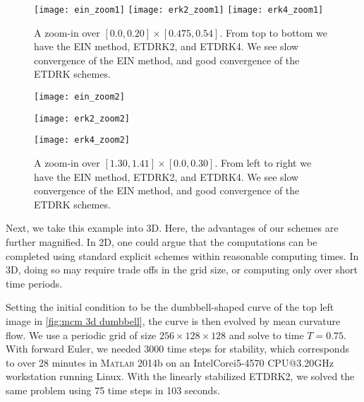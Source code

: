 \begin{figure}[htb!]
        \centering
\texttt{[image: ein\_zoom1]}
\texttt{[image: erk2\_zoom1]}
\texttt{[image: erk4\_zoom1]}
\caption[{A zoom-in over $ [0.0,0.20]\times [0.475,0.54]$ to inspect convergence.}]{A zoom-in over $[0.0, 0.20]\times [0.475, 0.54]$. From top to bottom we have the EIN method, ETDRK2, and ETDRK4. We see slow convergence of the EIN method, and good convergence of the ETDRK schemes.}
\label{fig:mcm zoom in 1}
\end{figure}

\begin{figure}[htb!]
        \centering
\begin{minipage}{0.30\textwidth}
        \texttt{[image: ein\_zoom2]}
\end{minipage}
\begin{minipage}{0.30\textwidth}
        \texttt{[image: erk2\_zoom2]}
\end{minipage}
\begin{minipage}{0.30\textwidth}
        \texttt{[image: erk4\_zoom2]}
\end{minipage}
\caption[{A zoom-in over $[1.30,1.41]\times [0.0, 0.30]$ to inspect convergence.}]{A zoom-in over $[1.30,1.41]\times [0.0, 0.30]$. From left to right we have the EIN method, ETDRK2, and ETDRK4. We see slow convergence of the EIN method, and good convergence of the ETDRK schemes.}
\label{fig:mcm zoom in 2}
\end{figure}

Next, we take this example into 3D. Here, the advantages of our schemes are further magnified. In 2D, one could argue that the computations can be completed using standard explicit schemes within reasonable computing times. In 3D, doing so may require trade offs in the grid size, or computing only over short time periods. 

Setting the initial condition to be the dumbbell-shaped curve of the top left image in \cref{fig:mcm 3d dumbbell}, the curve is then evolved by mean curvature flow. We use a periodic grid of size $256\times 128\times 128$ and solve to time $T=0.75$. With forward Euler, we needed $3000$ time steps for stability, which corresponds to over 28 minutes in \textsc{Matlab} 2014b on an Intel\textsuperscript{\textregistered}Core\textsuperscript{\texttrademark}i5-4570 CPU@3.20GHz workstation running Linux. With the linearly stabilized ETDRK2, we solved the same problem using 75 time steps in 103 seconds.

